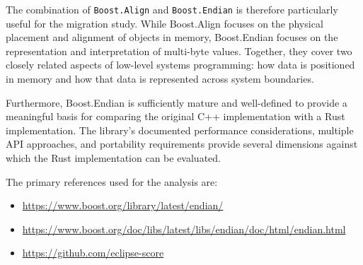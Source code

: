 The combination of \texttt{Boost.Align} and \texttt{Boost.Endian} is therefore particularly useful for the migration study. 
While Boost.Align focuses on the physical placement and alignment of objects in memory, 
Boost.Endian focuses on the representation and interpretation of multi-byte values. 
Together, they cover two closely related aspects of low-level systems programming: how data is positioned in memory and 
how that data is represented across system boundaries.

Furthermore, Boost.Endian is sufficiently mature and well-defined to provide a meaningful basis for 
comparing the original C++ implementation with a Rust implementation. The library's documented performance considerations, 
multiple API approaches, and portability requirements provide several dimensions against which the Rust implementation can be evaluated.

The primary references used for the analysis are:

\begin{itemize}
\item \url{https://www.boost.org/library/latest/endian/}
\item \url{https://www.boost.org/doc/libs/latest/libs/endian/doc/html/endian.html}
\item \url{https://github.com/eclipse-score}
\end{itemize}
